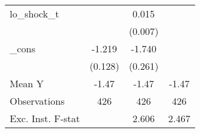 {\begin{tabular}{l*{3}{c}}
\addlinespace
lo\_shock\_t  &                     &       0.015\sym{**} &                     \\
            &                     &     (0.007)         &                     \\
\addlinespace
\_cons      &      -1.219\sym{***}&      -1.740\sym{***}&                     \\
            &     (0.128)         &     (0.261)         &                     \\
\midrule
Mean Y      &       -1.47         &       -1.47         &       -1.47         \\
Observations&         426         &         426         &         426         \\
Exc. Inst. F-stat&                     &       2.606         &       2.467         \\
\bottomrule
\end{tabular}
}

